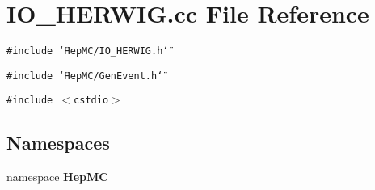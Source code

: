 \section{IO\_\-HERWIG.cc File Reference}
\label{IO__HERWIG_8cc}
{\tt \#include \char`\"{}Hep\-MC/IO\_\-HERWIG.h\char`\"{}}\par
{\tt \#include \char`\"{}Hep\-MC/Gen\-Event.h\char`\"{}}\par
{\tt \#include $<$cstdio$>$}\par
\subsection*{Namespaces}
\begin{CompactItemize}
\item 
namespace {\bf Hep\-MC}
\end{CompactItemize}

